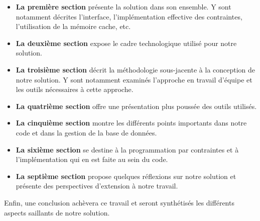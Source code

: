 \begin{itemize}
\item \textbf{La première section} présente la solution dans son ensemble. Y sont notamment décrites l'interface, l'implémentation effective des contraintes, l'utilisation de la mémoire cache, etc.\\

\item \textbf{La deuxième section} expose le cadre technologique utilisé pour notre solution.\\

\item \textbf{La troisième section} décrit la méthodologie sous-jacente à la conception de notre solution. Y sont notamment examinés l'approche en travail d'équipe et les outils nécessaires à cette approche.\\

\item \textbf{La quatrième section} offre une présentation plus poussée des outils utilisés.\\

\item \textbf{La cinquième section} montre les différents points importants dans notre code et dans la gestion de la base de données.\\

\item \textbf{La sixième section} se destine à la programmation par contraintes et à l'implémentation qui en est faite au sein du code.\\

\item \textbf{La septième section} propose quelques réflexions sur notre solution et présente des perspectives d'extension à notre travail.\\

\end{itemize}

Enfin, une conclusion achèvera ce travail et seront synthétisés les différents aspects saillants de notre solution.




